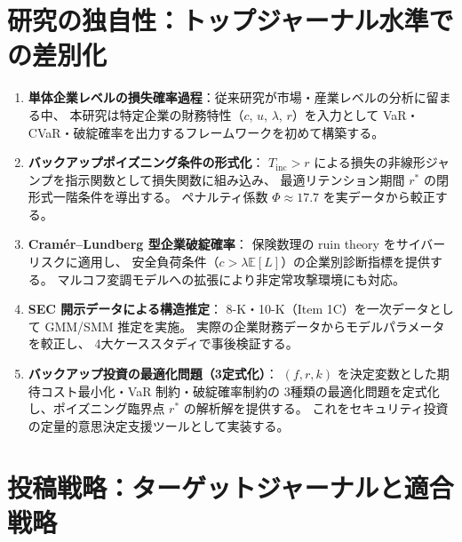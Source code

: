 \documentclass[a4paper,11pt]{article}
\newcommand{\E}{\mathbb{E}}
\theoremstyle{definition}
\begin{document}
\section{研究の独自性：トップジャーナル水準での差別化}
\label{sec:novelty}

\begin{tcolorbox}[noveltybox, title={本研究の 5 つの独自貢献（Top 5 Novelty Claims）}]
  \begin{enumerate}[leftmargin=1.5em, itemsep=4pt]
    \item \textbf{単体企業レベルの損失確率過程}：従来研究が市場・産業レベルの分析に留まる中、
    本研究は特定企業の財務特性（$c$, $u$, $\lambda$, $r$）を入力として
    VaR・CVaR・破綻確率を出力するフレームワークを初めて構築する。

    \item \textbf{バックアップポイズニング条件の形式化}：
    $T_{\mathrm{inc}} > r$ による損失の非線形ジャンプを指示関数として損失関数に組み込み、
    最適リテンション期間 $r^*$ の閉形式一階条件を導出する。
    ペナルティ係数 $\Phi \approx 17.7$ を実データから較正する。

    \item \textbf{Cramér--Lundberg 型企業破綻確率}：
    保険数理の ruin theory をサイバーリスクに適用し、
    安全負荷条件（$c > \lambda\E[L]$）の企業別診断指標を提供する。
    マルコフ変調モデルへの拡張により非定常攻撃環境にも対応。

    \item \textbf{SEC 開示データによる構造推定}：
    8-K・10-K（Item 1C）を一次データとして GMM/SMM 推定を実施。
    実際の企業財務データからモデルパラメータを較正し、
    4大ケーススタディで事後検証する。

    \item \textbf{バックアップ投資の最適化問題（3定式化）}：
    $(f, r, k)$ を決定変数とした期待コスト最小化・VaR 制約・破綻確率制約の
    3種類の最適化問題を定式化し、ポイズニング臨界点 $r^*$ の解析解を提供する。
    これをセキュリティ投資の定量的意思決定支援ツールとして実装する。
  \end{enumerate}
\end{tcolorbox}

\section{投稿戦略：ターゲットジャーナルと適合戦略}
\label{sec:submission}
\end{document}
